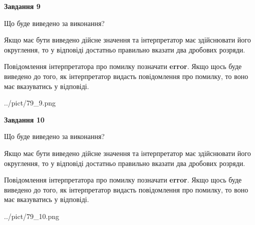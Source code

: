 \documentclass[12pt, ukrainian]{article}
\begin{document}
{\begin {Large}
{\begin {center}\textbf{Завдання 9}\end {center}}\par
Що буде виведено за виконання? \par

Якщо має бути виведено дійсне значення та інтерпретатор має здійснювати його округлення, 
то у відповіді достатньо правильно вказати два дробових розряди.

Повідомлення інтерпретатора про помилку позначати \textbf{error}.
Якщо щось буде виведено до того, як інтерпретатор видасть повідомлення про помилку, 
то воно має вказуватись у відповіді. \par

\begin{center}
	{../pict/79_9.png}
\end{center}
\newpage

{\begin {center}\textbf{Завдання 10}\end {center}}\par
Що буде виведено за виконання? \par

Якщо має бути виведено дійсне значення та інтерпретатор має здійснювати його округлення, 
то у відповіді достатньо правильно вказати два дробових розряди.

Повідомлення інтерпретатора про помилку позначати \textbf{error}.
Якщо щось буде виведено до того, як інтерпретатор видасть повідомлення про помилку, 
то воно має вказуватись у відповіді. \par

\begin{center}
	{../pict/79_10.png}
\end{center}
\newpage

\end {Large}}
\end{document}
